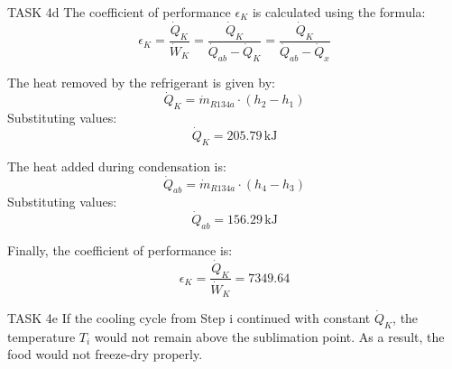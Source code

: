 TASK 4d  
The coefficient of performance \( \epsilon_K \) is calculated using the formula:  
\[
\epsilon_K = \frac{\dot{Q}_K}{\dot{W}_K} = \frac{\dot{Q}_K}{\dot{Q}_{ab} - \dot{Q}_K} = \frac{\dot{Q}_K}{\dot{Q}_{ab} - \dot{Q}_x}
\]

The heat removed by the refrigerant is given by:  
\[
\dot{Q}_K = \dot{m}_{R134a} \cdot (h_2 - h_1)
\]  
Substituting values:  
\[
\dot{Q}_K = 205.79 \, \text{kJ}
\]

The heat added during condensation is:  
\[
\dot{Q}_{ab} = \dot{m}_{R134a} \cdot (h_4 - h_3)
\]  
Substituting values:  
\[
\dot{Q}_{ab} = 156.29 \, \text{kJ}
\]

Finally, the coefficient of performance is:  
\[
\epsilon_K = \frac{\dot{Q}_K}{\dot{W}_K} = 7349.64
\]

TASK 4e  
If the cooling cycle from Step i continued with constant \( \dot{Q}_K \), the temperature \( T_i \) would not remain above the sublimation point. As a result, the food would not freeze-dry properly.